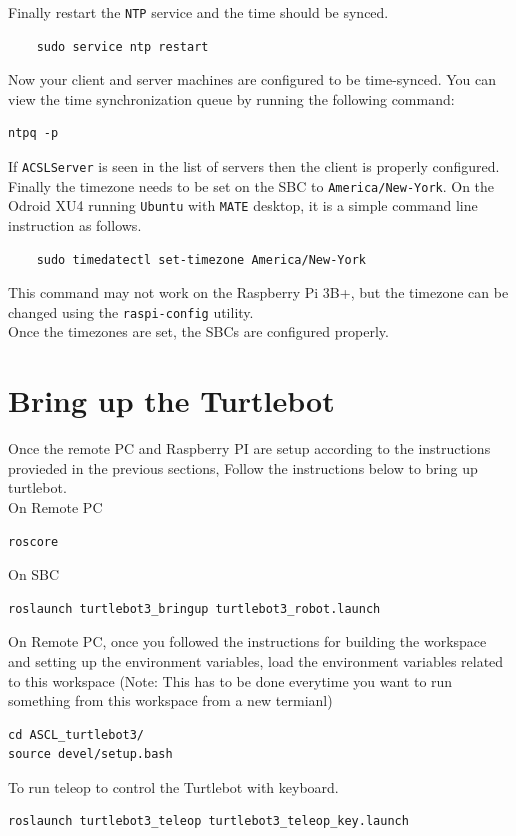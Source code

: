 \documentclass[12]{article}
\begin{document}
Finally restart the \texttt{NTP} service and the time should be synced.
\begin{lstlisting}
	sudo service ntp restart
\end{lstlisting}
Now your client and server machines are configured to be time-synced. You can view the time synchronization queue by running the following command:
\begin{lstlisting}
ntpq -p
\end{lstlisting}
If \texttt{ACSLServer} is seen in the list of servers then the client is properly configured.\\
Finally the timezone needs to be set on the SBC to \texttt{America/New-York}. On the Odroid XU4 running \texttt{Ubuntu} with \texttt{MATE} desktop, it is a simple command line instruction as follows.
\begin{lstlisting}
	sudo timedatectl set-timezone America/New-York
\end{lstlisting}
This command may not work on the Raspberry Pi 3B+, but the timezone can be changed using the \texttt{raspi-config} utility.\\
Once the timezones are set, the SBCs are configured properly.
\newpage
\section{Bring up the Turtlebot}
Once the remote PC and Raspberry PI are setup according to the instructions provieded in the previous sections, 
Follow the instructions below to bring up turtlebot.  \\
On Remote PC
\begin{lstlisting}[style=bash]
    roscore
\end{lstlisting}
On SBC
\begin{lstlisting}[style=bash]
    roslaunch turtlebot3_bringup turtlebot3_robot.launch
\end{lstlisting}

On Remote PC, once you followed the instructions for building the workspace and setting up the environment variables,  
load the environment variables related to this workspace (Note: This has to be done everytime you want to run something from this workspace from a new termianl)
\begin{lstlisting}[style=bash]
cd ASCL_turtlebot3/
source devel/setup.bash
\end{lstlisting}

To run teleop to control the Turtlebot with keyboard.
\begin{lstlisting}[style=bash]
roslaunch turtlebot3_teleop turtlebot3_teleop_key.launch
\end{lstlisting}
\end{document}
